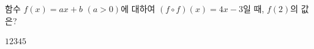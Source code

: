 \hspace*{2mm}\begin{minipage}[t]{\dimexpr\linewidth-2mm\relax}\vspace{0pt}
함수 $f(x)=ax+b$ $(a>0)$에 대하여 $(f\circ f)(x)=4x-3$일 때, $f(2)$의 값은? 
\begin{choices32}{$1$}{$2$}{$3$}{$4$}{$5$}\end{choices32}\end{minipage}
